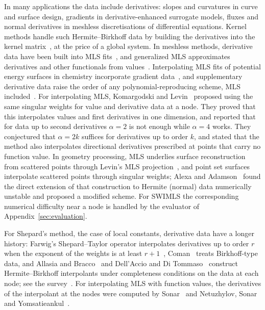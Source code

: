 \documentclass[12pt]{amsart}
\theoremstyle{definition}
\theoremstyle{remark}
\begin{document}
In many applications the data include derivatives: slopes and curvatures in curve and surface
design, gradients in derivative-enhanced surrogate models, fluxes and normal derivatives in
meshless discretisations of differential equations. Kernel methods handle such
Hermite--Birkhoff data by building the derivatives into the kernel
matrix~\cite{Wu1992,NarcowichWard1994}, at the price of a global system. In meshless methods, derivative data
have been built into MLS fits~\cite{AtluriChoKim1999}, and generalized MLS approximates
derivatives and other functionals from values~\cite{MirzaeiSchabackDehghan2012}. Interpolating MLS fits
of potential energy surfaces in chemistry incorporate gradient
data~\cite{TokmakovWagnerMinkoffThompson2007}, and supplementary derivative data raise the
order of any polynomial-reproducing scheme, MLS included~\cite{KraaijpoelvanLeeuwen2010}. For
interpolating MLS, Komargodski and Levin~\cite{KomargodskiLevin2006} proposed using the same
singular weights for value and derivative data at a node. They proved that this interpolates
values and first derivatives in one dimension, and reported that for data up to second
derivatives $\alpha=2$ is not enough while $\alpha=4$ works. They conjectured that $\alpha=2k$
suffices for derivatives up to order $k$, and stated that the method also interpolates
directional derivatives prescribed at points that carry no function value.
In geometry processing, MLS underlies surface reconstruction from scattered points through
Levin's MLS projection~\cite{Levin2004}, and point set surfaces interpolate scattered points through singular
weights; Alexa and Adamson~\cite{AlexaAdamson2009} found the direct extension of that
construction to Hermite (normal) data numerically unstable and proposed a modified scheme. For
SWIMLS the corresponding numerical difficulty near a node is handled by the evaluator of
Appendix~\ref{sec:evaluation}.

For Shepard's method, the case of local constants, derivative data have a longer history:
Farwig's Shepard--Taylor operator interpolates derivatives up to order $r$ when the exponent of
the weights is at least $r+1$~\cite{Farwig1986}, Coman~\cite{Coman1998} treats Birkhoff-type
data, and Allasia and Bracco~\cite{AllasiaBracco2012} and Dell'Accio and Di
Tommaso~\cite{DellAccioDiTommaso2016} construct Hermite--Birkhoff interpolants under
completeness conditions on the data at each node; see the survey~\cite{DellAccioDiTommasoSurvey}.
For interpolating MLS with function values, the derivatives of the interpolant at the nodes
were computed by Sonar~\cite{Sonar2005} and Netuzhylov, Sonar and
Yomsatieankul~\cite{NetuzhylovSonarYomsatieankul2007}.
\end{document}
